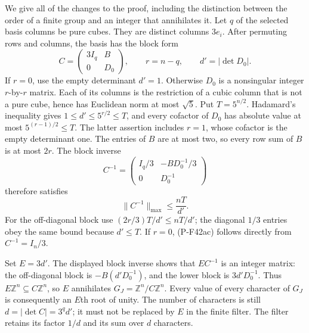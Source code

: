 \documentclass[11pt,a4paper]{article}
\begin{document}
We give all of the changes to the proof, including the distinction
between the order of a finite group and an integer that annihilates
it. Let \(q\) of the selected basis columns be pure cubes.
They are distinct columns \(3e_i\). After permuting rows and
columns, the basis has the block form
\[
 C=\begin{pmatrix}3I_q&B\\0&D_0\end{pmatrix},
 \qquad r=n-q,\qquad d'=|\det D_0|.
 \tag{P-F42ab}
\]
If \(r=0\), use the empty determinant \(d'=1\).
Otherwise \(D_0\) is a nonsingular integer \(r\)-by-\(r\)
matrix. Each of its columns is the restriction of a cubic
column that is not a pure cube, hence has Euclidean norm
at most \(\sqrt5\). Put \(T=5^{n/2}\).
Hadamard's inequality gives \(1\le d'\le5^{r/2}\le T\),
and every cofactor of \(D_0\) has absolute value at most
\(5^{(r-1)/2}\le T\). The latter assertion includes \(r=1\),
whose cofactor is the empty determinant one.
The entries of \(B\) are at most two, so every row sum of
\(B\) is at most \(2r\).
The block inverse
\[
 C^{-1}=
 \begin{pmatrix}
  I_q/3&-BD_0^{-1}/3\\
  0&D_0^{-1}
 \end{pmatrix}
\]
therefore satisfies
\[
       \|C^{-1}\|_{\max}\le \frac{nT}{d'}.
 \tag{P-F42ac}
\]
For the off-diagonal block use
\((2r/3)T/d'\le nT/d'\);
the diagonal \(1/3\) entries obey the same bound because
\(d'\le T\). If \(r=0\), (P-F42ac) follows directly from
\(C^{-1}=I_n/3\).

Set \(E=3d'\). The displayed block inverse shows that
\(EC^{-1}\) is an integer matrix: the off-diagonal block
is \(-B(d'D_0^{-1})\), and the lower block is
\(3d'D_0^{-1}\). Thus \(E\mathbb Z^n\subseteq C\mathbb Z^n\),
so \(E\) annihilates \(G_J=\mathbb Z^n/C\mathbb Z^n\).
Every value of every character of \(G_J\) is consequently
an \(E\)th root of unity.
The number of characters is still
\(d=|\det C|=3^q d'\); it must not be replaced by \(E\)
in the finite filter. The filter retains its factor \(1/d\)
and its sum over \(d\) characters.
\end{document}
